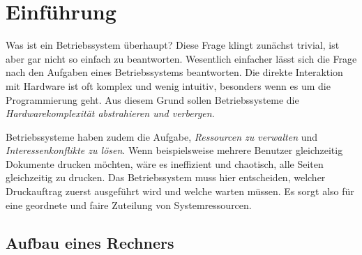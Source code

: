\chapter{Einführung}

Was ist ein Betriebssystem überhaupt? Diese Frage klingt zunächst trivial, ist aber gar nicht so einfach zu beantworten. Wesentlich einfacher lässt sich die Frage nach den Aufgaben eines Betriebssystems beantworten. Die direkte Interaktion mit Hardware ist oft komplex und wenig intuitiv, besonders wenn es um die Programmierung geht. Aus diesem Grund sollen Betriebssysteme die \textit{Hardwarekomplexität abstrahieren und verbergen}.

Betriebssysteme haben zudem die Aufgabe, \textit{Ressourcen zu verwalten} und \textit{Interessenkonflikte zu lösen}. Wenn beispielsweise mehrere Benutzer gleichzeitig Dokumente drucken möchten, wäre es ineffizient und chaotisch, alle Seiten gleichzeitig zu drucken. Das Betriebssystem muss hier entscheiden, welcher Druckauftrag zuerst ausgeführt wird und welche warten müssen. Es sorgt also für eine geordnete und faire Zuteilung von Systemressourcen.

\section{Aufbau eines Rechners}

